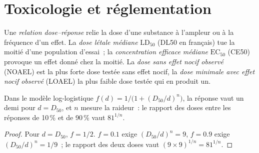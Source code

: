 \section{Toxicologie et réglementation}

\begin{definition}\label{def:b3:environmental-toxicology:dose}
Une \emph{relation dose--réponse} relie la
dose d'une substance à l'ampleur ou à la fréquence d'un effet. La \emph{dose létale médiane} $\mathrm{LD_{50}}$ (DL50 en français) tue la moitié d'une population d'essai~; la
\emph{concentration efficace médiane} $\mathrm{EC_{50}}$
(CE50) provoque un effet donné chez la moitié. La \emph{dose sans effet nocif observé} (NOAEL) est la plus forte dose
testée sans effet nocif, la \emph{dose minimale avec effet nocif observé} (LOAEL) la plus faible dose
testée qui en produit un.
\end{definition}

\begin{proposition}\label{prop:b3:environmental-toxicology:dose-response}
Dans le modèle log-logistique $f(d) = 1/\bigl(1 + (D_{50}/d)^n\bigr)$, la réponse vaut un demi pour $d = D_{50}$, et $n$
mesure la raideur~: le rapport des doses entre les réponses de 10\,\% et de 90\,\% vaut $81^{1/n}$.
\end{proposition}

\begin{proof}
Pour $d = D_{50}$, $f = 1/2$. $f = 0.1$ exige $(D_{50}/d)^n = 9$, $f = 0.9$ exige $(D_{50}/d)^n = 1/9$~; le rapport des deux doses
vaut $(9 \times 9)^{1/n} = 81^{1/n}$.
\end{proof}

